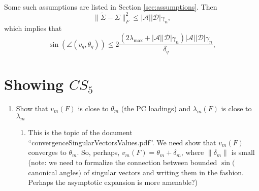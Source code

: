 \documentclass[11pt]{article}
\newcommand{\norm}[1]{\lVert #1 \rVert}
\newcommand{\A}{\mathcal{A}}
\newcommand{\D}{\mathcal{D}}
\begin{document}
Some such assumptions are listed in Section \ref{sec:assumptions}. Then
\[
\norm{\tilde{\Sigma} - \Sigma}_{F}^2 \leq |\A||\D|\gamma_n,
\]
which implies that
\[
\sin(\angle (v_q,\theta_q))
\leq 
2\frac{(2\lambda_{\max} + |\A||\D|\gamma_n)|\A||\D|\gamma_n}{\delta_q},
\]

\section{Showing $CS_5$}
\begin{enumerate}
\item Show that $v_m(F)$ is close to $\theta_m$ (the PC loadings) and $\lambda_m(F)$ is close to $\lambda_m$
\begin{enumerate}
\item This is the topic of the document ``convergenceSingularVectorsValues.pdf''.  We need show that $v_m(F)$ converges to $\theta_m$.  So, perhaps, $v_m(F) = \theta_m + \delta_m$,
where $\norm{\delta_m}$ is small (note: we need to formalize the connection between bounded $\sin($ canonical angles$)$ of singular vectors and writing them in the fashion.  Perhaps
the asymptotic expansion is more amenable?)

\end{enumerate}


\end{enumerate}
\end{document}
